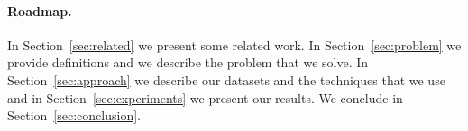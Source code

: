\paragraph{Roadmap.} In Section~\ref{sec:related} we present some related
work. In Section~\ref{sec:problem} we provide definitions and we
describe the problem that we solve. In Section~\ref{sec:approach} we
describe our datasets and the techniques that we use and in
Section~\ref{sec:experiments} we present our results. We conclude in
Section~\ref{sec:conclusion}.

%
%
%
%
%
%
%
%
%
%
%
